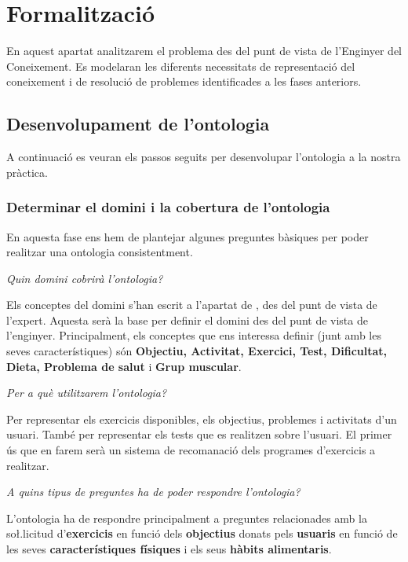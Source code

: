 \documentclass[a4paper, 12pt, UTF8]{article}
\begin{document}
\section{Formalització}

En aquest apartat analitzarem el problema des del punt de vista de l'Enginyer del Coneixement. Es modelaran les diferents necessitats de representació del coneixement i de resolució de problemes identificades a les fases anteriors.

\subsection{Desenvolupament de l'ontologia}

A continuació es veuran els passos seguits per desenvolupar l'ontologia a la nostra pràctica.

\subsubsection{Determinar el domini i la cobertura de l'ontologia}

En aquesta fase ens hem de plantejar algunes preguntes bàsiques per poder realitzar una ontologia consistentment.

\emph{Quin domini cobrirà l'ontologia?}

Els conceptes del domini s'han escrit a l'apartat de \textit{}, des del punt de vista de l'expert. Aquesta serà la base per definir el domini des del punt de vista de l'enginyer. Principalment, els conceptes que ens interessa definir (junt amb les seves característiques) són \textbf{Objectiu, Activitat, Exercici, Test, Dificultat, Dieta, Problema de salut} i \textbf{Grup muscular}.

\emph{Per a què utilitzarem l'ontologia?}

Per representar els exercicis disponibles, els objectius, problemes i activitats d'un usuari. També per representar  els tests que es realitzen sobre l'usuari. El primer ús que en farem serà un sistema de recomanació dels programes d'exercicis a realitzar.

\emph{A quins tipus de preguntes ha de poder respondre l'ontologia?}

L'ontologia ha de respondre principalment a preguntes relacionades amb la so\l.licitud d'\textbf{exercicis} en funció dels \textbf{objectius} donats pels \textbf{usuaris} en funció de les seves \textbf{característiques físiques} i els seus \textbf{hàbits alimentaris}.
\end{document}
